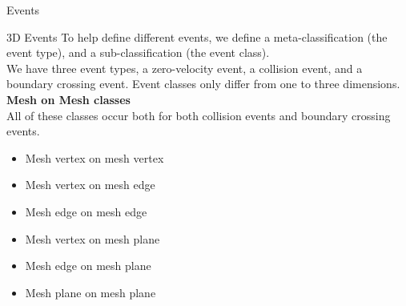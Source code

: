 \documentclass[11pt]{article}
\begin{document}
\begin{section}{Events}
\begin{subsection}{3D Events}
To help define different events, we define a meta-classification (the event type), and a sub-classification (the event class).\\

We have three event types, a zero-velocity event, a collision event, and a boundary crossing event. Event classes only differ from one to three dimensions.\\

\textbf{Mesh on Mesh classes}\\
All of these classes occur both for both collision events and boundary crossing events.
\begin{itemize}
\item Mesh vertex on mesh vertex
\item Mesh vertex on mesh edge
\item Mesh edge on mesh edge
\item Mesh vertex on mesh plane
\item Mesh edge on mesh plane
\item Mesh plane on mesh plane
\end{itemize}

\end{subsection}
\end{section}
\end{document}
